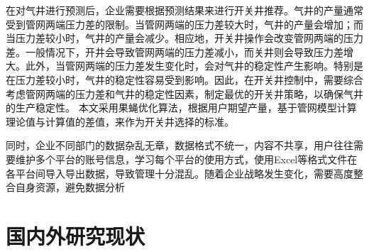 在对气井进行预测后，企业需要根据预测结果来进行开关井推荐。气井的产量通常受到管网两端压力差的限制。当管网两端的压力差较大时，气井的产量会增加；而当压力差较小时，气井的产量会减少。相应地，开关井操作会改变管网两端的压力差。一般情况下，开井会导致管网两端的压力差减小，而关井则会导致压力差增大。此外，当管网两端的压力差发生变化时，会对气井的稳定性产生影响。特别是在压力差较小时，气井的稳定性容易受到影响。因此，在开关井控制中，需要综合考虑管网两端的压力差和气井的稳定性因素，制定最优的开关井策略，以确保气井的生产稳定性。
本文采用果蝇优化算法，根据用户期望产量，基于管网模型计算理论值与计算值的差值，来作为开关井选择的标准。

同时，企业不同部门的数据杂乱无章，数据格式不统一，内容不共享，用户往往需要维护多个平台的账号信息，学习每个平台的使用方式，使用Excel等格式文件在各平台间导入导出数据，导致管理十分混乱。随着企业战略发生变化，需要高度整合自身资源，避免数据分析

\section{国内外研究现状}